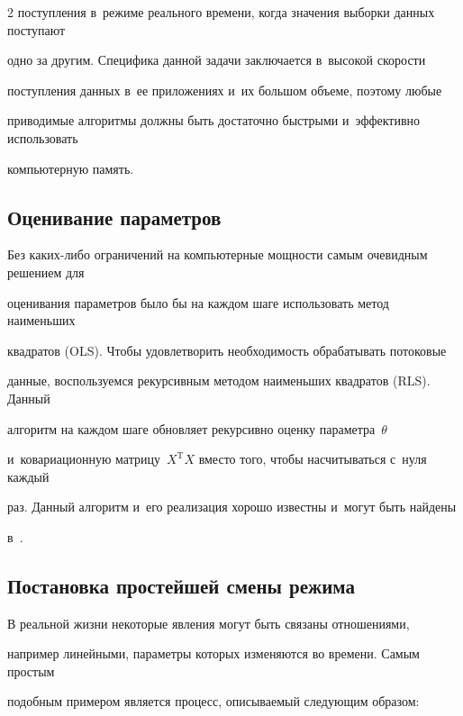 \begin{multicols}{2}
поступления в~режиме реального времени, когда значения выборки данных поступают 


одно за другим. Специфика данной задачи заключается в~высокой скорости 


поступления данных в~ее приложениях и~их большом объеме, поэтому любые 


приводимые алгоритмы должны быть достаточно быстрыми и~эффективно использовать 


компьютерную память.





\subsection{Оценивание параметров}





Без каких-ли\-бо ограничений на компьютерные мощности самым очевидным решением для 


оценивания параметров было бы на каждом шаге использовать метод наименьших 


квадратов (OLS). Чтобы удовлетворить необходимость обрабатывать потоковые 


данные, воспользуемся рекурсивным методом наименьших квадратов (RLS). Данный 


алгоритм на каждом шаге обновляет рекурсивно оценку параметра~$\theta$ 


и~ковариационную матрицу~$X^{\mathrm{T}} X$  вмес\-то того, чтобы насчитываться с~нуля каждый 


раз. Данный алгоритм и~его реализация хорошо известны и~могут быть найдены 


в~\cite{haykin}.





\subsection{Постановка простейшей смены режима}





        В реальной жизни некоторые явления могут быть связаны отношениями, 


например линейными, параметры которых изменяются во времени. Самым простым 


подобным примером является процесс, описываемый следующим образом:      



\end{multicols}
